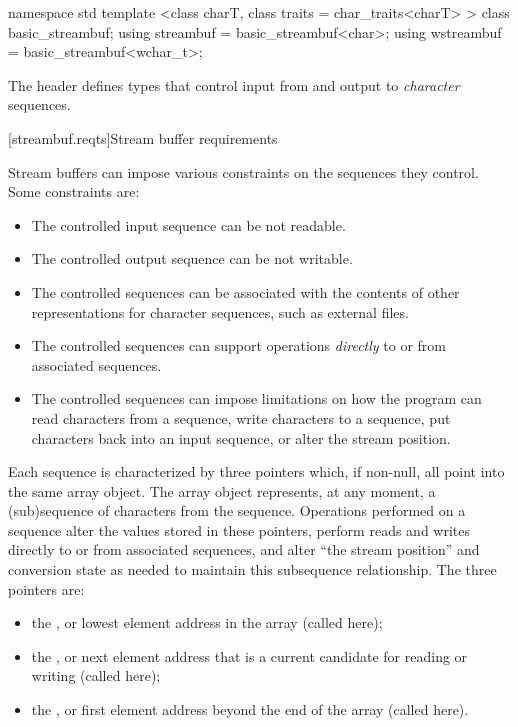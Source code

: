 %
%
%
%
\begin{codeblock}
namespace std {
  template <class charT, class traits = char_traits<charT> >
    class basic_streambuf;
  using streambuf  = basic_streambuf<char>;
  using wstreambuf = basic_streambuf<wchar_t>;
}
\end{codeblock}

\pnum
The header
defines types that control input from and output to
\textit{character}
sequences.

[streambuf.reqts]{Stream buffer requirements}

\pnum
Stream buffers can impose various constraints on the sequences they control.
Some constraints are:
\begin{itemize}
\item
The controlled input sequence can be not readable.
\item
The controlled output sequence can be not writable.
\item
The controlled sequences can be associated with the contents of other
representations for character sequences, such as external files.
\item
The controlled sequences can support operations
\textit{directly}
to or from associated sequences.
\item
The controlled sequences can impose limitations on how the program can
read characters from a sequence,
write characters to a sequence,
put characters back into an input sequence, or
alter the stream position.
\end{itemize}

\pnum
Each sequence is characterized by three pointers which, if non-null,
all point into the same
array object.
The array object represents, at any moment,
a (sub)sequence of characters from the sequence.
Operations performed on a sequence alter the values stored in these pointers,
perform reads and writes directly to or from associated sequences, and
alter ``the stream position'' and conversion state as needed to
maintain this subsequence relationship.
The three pointers are:
\begin{itemize}
\item
the
,
or lowest element address in the array
(called  here);
\item
the
,
or next element address that is a current
candidate for reading or writing (called  here);
\item
the
,
or first element address beyond the end of
the array (called  here).
\end{itemize}

